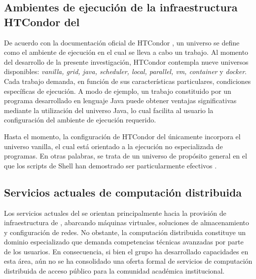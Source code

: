 

\subsection{Ambientes de ejecución de la infraestructura HTCondor del \GRID}
\noindent{}
De acuerdo con la documentación oficial de HTCondor \citep{HTCondor-choosing-universe}, un universo se define como el ambiente de ejecución en el cual se lleva a cabo un trabajo. Al momento del desarrollo de la presente investigación, HTCondor contempla nueve universos disponibles: \textit{vanilla, grid, java, scheduler, local, parallel, vm, container} y \textit{docker}. Cada trabajo demanda, en función de sus características particulares, condiciones específicas de ejecución. A modo de ejemplo, un trabajo constituido por un programa desarrollado en lenguaje Java puede obtener ventajas significativas mediante la utilización del universo Java, lo cual facilita al usuario la configuración del ambiente de ejecución requerido.

Hasta el momento, la configuración de HTCondor del \GRID únicamente incorpora el universo vanilla, el cual está orientado a la ejecución no especializada de programas. En otras palabras, se trata de un universo de propósito general en el que los scripts de Shell han demostrado ser particularmente efectivos \citep{HTCondor-choosing-universe}.


\subsection{Servicios actuales de computación distribuida}
\noindent
Los servicios actuales del \GRID se orientan principalmente hacia la provisión de infraestructura de \TI, abarcando máquinas virtuales, soluciones de almacenamiento y configuración de redes. No obstante, la computación distribuida constituye un dominio especializado que demanda competencias técnicas avanzadas por parte de los usuarios. En consecuencia, si bien el grupo ha desarrollado capacidades en esta área, aún no se ha consolidado una oferta formal de servicios de computación distribuida de acceso público para la comunidad académica institucional.

%
